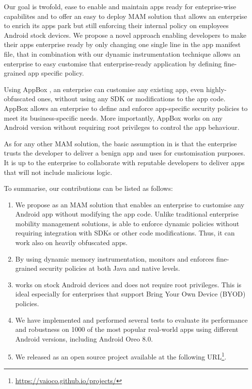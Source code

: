 Our goal is twofold, ease to enable and maintain apps ready for enteprise-wise capabilites and to offer an easy to deploy MAM solution that allows an enterprise to enrich its apps park but still enforcing their internal policy on employees Android stock devices. We propose a novel approach enabling developers to make their apps enterprise ready by only changing one single line in the app manifest file, that in combination with our dynamic instrumentation technique allows an enterprise to easy customise that enterprise-ready application by defining fine-grained app specific policy. 

Using AppBox , an enterprise can customise any existing app, even highly-obfuscated ones, without using any SDK or modifications to the app code. AppBox allows an enterprise to define and enforce app-specific security policies to meet its business-specific needs. More importantly, AppBox works on any Android version without requiring root privileges to control the app behaviour.

As for any other MAM solution, the basic assumption in \asd is that the enterprise trusts the developer to deliver a benign app and uses \asd for customisation purposes. It is up to the enterprise to collaborate with reputable developers to deliver apps that will not include malicious logic. 

To summarise, our contributions can be listed as follows: 

\begin{enumerate}
\item We propose \asd as an MAM solution that enables an enterprise to customise any Android app without modifying the app code. Unlike traditional enterprise mobility management solutions, \asd is able to enforce dynamic policies without requiring integration with SDKs or other code modifications. Thus, it can work also on heavily obfuscated apps.

\item By using dynamic memory instrumentation, \asd monitors and enforces fine-grained security policies at both Java and native levels.

\item \asd works on stock Android devices and does not require root privileges. This is ideal especially for enterprises that support Bring Your Own Device (BYOD) policies.  

\item We have implemented \asd and performed several tests to evaluate its performance and robustness on 1000 of the most popular real-world apps using  different Android versions, including Android Oreo 8.0. 

\item We released \asd as an open source project available at the following URL\footnote{ \url{https://vaioco.github.io/projects/}}.
\end{enumerate}


